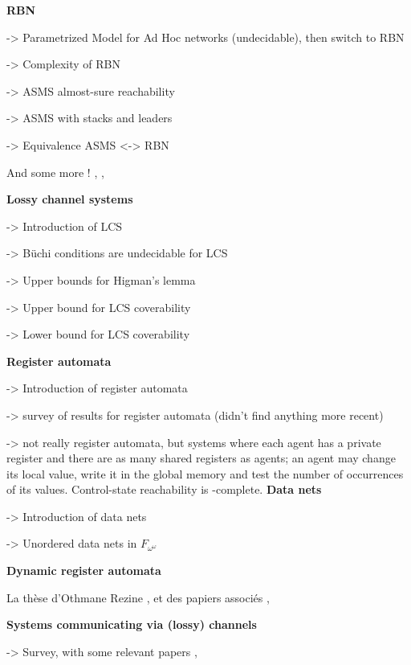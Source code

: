 	\textbf{RBN}
	
	\cite{DelzannoSZ2010Adhoc} -> Parametrized Model for Ad Hoc networks (undecidable), then switch to RBN
	
	\cite{Delzanno2012complexity} -> Complexity of RBN
	
	\cite{BouyerMRSS2016} -> ASMS almost-sure reachability
	
	\cite{fortin2017model} -> ASMS with stacks and leaders
	
	\cite{BalaW2021} -> Equivalence ASMS <-> RBN
	
	And some more ! \cite{BalasubramanianBM2018parameterized}, \cite{BalasubramanianGW2022parameterized}, 	\cite{ChiniMS2019liveness} 
	
	\textbf{Lossy channel systems}
	
	\cite{AbdullaJ1996verif} -> Introduction of LCS
	
	\cite{AbdullaJ1996undec} -> Büchi conditions are undecidable for LCS 
	
	\cite{SchmitzS2011upperHigman} -> Upper bounds for Higman's lemma
	
	\cite{ChambartS2008ordinal} -> Upper bound for LCS coverability 
	
	\cite{Schnoebelen2002verifying} -> Lower bound for LCS coverability 
	

	\textbf{Register automata}
	
	\cite{kaminski1994finite} -> Introduction of register automata
	
	\cite{segoufin2006automata} -> survey of results for register automata (didn't find anything more recent)
	


	\cite{BRS21} -> not really register automata, but systems where each agent has a private register and there are as many shared registers as agents; an agent may change its local value, write it in the global memory and test the number of occurrences of its values. Control-state reachability is \PSPACE-complete.
	\textbf{Data nets}
	
	\cite{lazic2007nets} -> Introduction of data nets
	
	\cite{ROSAVELARDO201741} -> Unordered data nets in $F_{\omega^\omega}$
	
	\textbf{Dynamic register automata}
	
	La thèse d'Othmane Rezine \cite{Rezine2017verification}, et des papiers associés 
	\cite{AbdullaAKR2014verification},
	\cite{AbdullaAKR2015verification}
	
	\textbf{Systems communicating via (lossy) channels}
	
	\cite{Aiswarya2021network} -> Survey, with some relevant papers 	\cite{Aiswarya2015model},
	\cite{AbdullaAA2016data}
	
